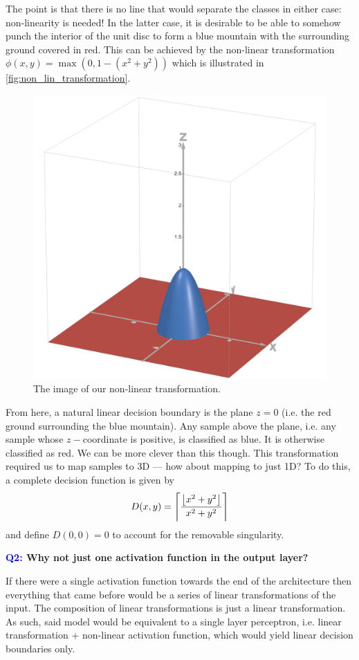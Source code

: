 \documentclass[11pt]{article}
\begin{document}
The point is that there is no line that would separate the classes in either case: non-linearity is needed! In the latter case, it is desirable to be able to somehow punch the interior of the unit disc to form a blue mountain with the surrounding ground covered in red. This can be achieved by the non-linear transformation $\phi(x,y)=\max(0,1-(x^2+y^2))$ which is illustrated in \autoref{fig:non_lin_transformation}.

\begin{figure}[t]
    \centering
    \includegraphics[width=0.40\columnwidth]{./figures/neural_nets//NLA_non_lin_transform.png}
    \caption{The image of our non-linear transformation. }
    \label{fig:non_lin_transformation}
\end{figure}

From here, a natural linear decision boundary is the plane $z=0$ (i.e. the red ground surrounding the blue mountain). Any sample above the plane, i.e. any sample whose $z-$coordinate is positive, is classified as blue. It is otherwise classified as red. We can be more clever than this though. This transformation required us to map samples to 3D — how about mapping to just 1D? To do this, a complete decision function is given by
$$
D(x,y)=\left\lceil\frac{\left\lfloor x^2+y^2\right\rfloor}{x^2+y^2}\right\rceil
$$
and define $D(0,0)=0$ to account for the removable singularity.

\begin{center}
    \textbf{\textcolor{blue}{Q2:} Why not just one activation function in the output layer?}
\end{center}
If there were a single activation function towards the end of the architecture then everything that came before would be a series of linear transformations of the input. The composition of linear transformations is just a linear transformation. As such, said model would be equivalent to a single layer perceptron, i.e. linear transformation + non-linear activation function, which would yield linear decision boundaries only.
\end{document}
